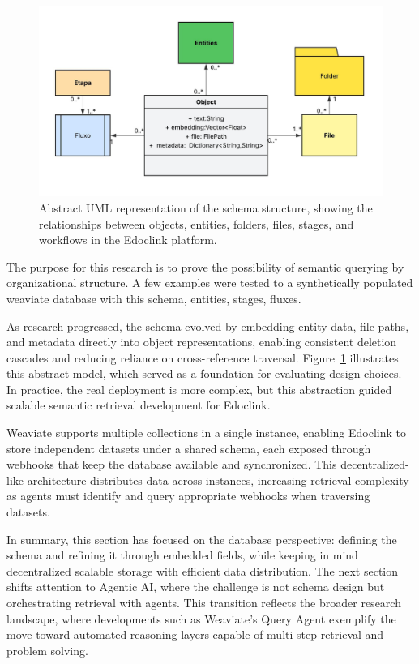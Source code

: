 \begin{figure}[h!]
    \centering
    \includegraphics[width=1\linewidth]{Images/Classe UML.jpeg}
    \caption{Abstract UML representation of the schema structure, showing the relationships between objects, entities, folders, files, stages, and workflows in the Edoclink platform.}\label{fig:weaviate_class}
\end{figure}

The purpose for this research is to prove the possibility of semantic querying by organizational structure. A few examples were tested to a synthetically populated weaviate database with this schema, entities, stages, fluxes.

As research progressed, the schema evolved by embedding entity data, file paths, and metadata directly into object representations, enabling consistent deletion cascades and reducing reliance on cross-reference traversal. Figure~\ref{fig:weaviate_class} illustrates this abstract model, which served as a foundation for evaluating design choices. In practice, the real deployment is more complex, but this abstraction guided scalable semantic retrieval development for Edoclink.

Weaviate supports multiple collections in a single instance, enabling Edoclink to store independent datasets under a shared schema, each exposed through webhooks that keep the database available and synchronized. This decentralized-like architecture distributes data across instances, increasing retrieval complexity as agents must identify and query appropriate webhooks when traversing datasets.

In summary, this section has focused on the database perspective: defining the schema and refining it through embedded fields, while keeping in mind decentralized scalable storage with efficient data distribution. The next section shifts attention to Agentic AI, where the challenge is not schema design but orchestrating retrieval with agents. This transition reflects the broader research landscape, where developments such as Weaviate's Query Agent \cite{weaviate} exemplify the move toward automated reasoning layers capable of multi-step retrieval and problem solving. 

